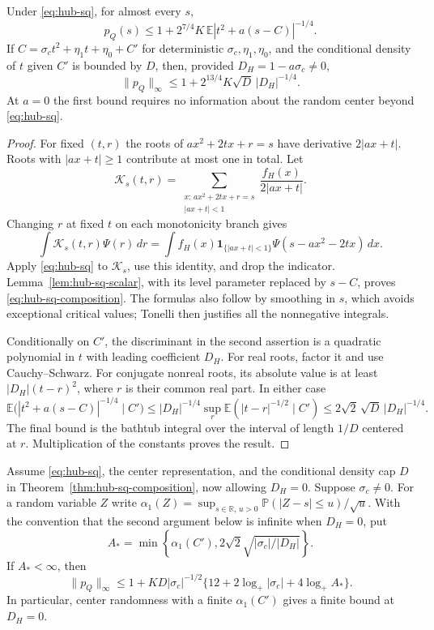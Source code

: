 \begin{theorem}
\label{thm:hub-sq-composition}
Under \eqref{eq:hub-sq}, for almost every $s$,
\begin{equation}\label{eq:hub-sq-composition}
 p_Q(s)\le1+2^{7/4}K\,
                    \mathbb E|t^2+a(s-C)|^{-1/4}.
\end{equation}
If $C=\sigma_c t^2+\eta_1t+\eta_0+C'$ for deterministic
$\sigma_c,\eta_1,\eta_0$, and the conditional density of $t$
given $C'$ is bounded by $D$, then, provided
$D_H=1-a\sigma_c\ne0$,
\[
 \|p_Q\|_\infty
 \le1+2^{13/4}K\sqrt D\,|D_H|^{-1/4}.
\]
At $a=0$ the first bound requires no information about the
random center beyond \eqref{eq:hub-sq}.
\end{theorem}

\begin{proof}
For fixed $(t,r)$ the roots of $ax^2+2tx+r=s$ have derivative
$2|ax+t|$.  Roots with $|ax+t|\ge1$ contribute at most one
in total.  Let
\[
 \mathcal K_s(t,r)=
 \sum_{\substack{x:\,ax^2+2tx+r=s\\|ax+t|<1}}
                         \frac{f_H(x)}{2|ax+t|}.
\]
Changing $r$ at fixed $t$ on each monotonicity branch gives
\[
 \int \mathcal K_s(t,r)\Psi(r)\,dr
 =\int f_H(x)\mathbf1_{\{|ax+t|<1\}}
                    \Psi(s-ax^2-2tx)\,dx.
\]
Apply \eqref{eq:hub-sq} to $\mathcal K_s$, use this identity,
and drop the indicator.  Lemma~\ref{lem:hub-sq-scalar},
with its level parameter replaced by $s-C$, proves
\eqref{eq:hub-sq-composition}.
The formulas also follow by smoothing in $s$, which avoids
exceptional critical values; Tonelli then justifies all the
nonnegative integrals.

Conditionally on $C'$, the discriminant in the second assertion
is a quadratic polynomial in $t$ with leading coefficient $D_H$.
For real roots, factor it and use Cauchy--Schwarz.
For conjugate nonreal roots, its absolute value is at least
$|D_H|(t-r)^2$, where $r$ is their common real part.
In either case
\[
 \mathbb E\bigl(|t^2+a(s-C)|^{-1/4}\mid C'\bigr)
 \le |D_H|^{-1/4}
             \sup_r\mathbb E(|t-r|^{-1/2}\mid C')
 \le2\sqrt2\,\sqrt D\,|D_H|^{-1/4}.
\]
The final bound is the bathtub integral over the interval of
length $1/D$ centered at $r$.  Multiplication of the constants
proves the result.
\end{proof}

\begin{proposition}
\label{prop:hub-sq-log}
Assume \eqref{eq:hub-sq}, the center representation, and the
conditional density cap $D$ in
Theorem~\ref{thm:hub-sq-composition}, now allowing $D_H=0$.
Suppose $\sigma_c\ne0$.
For a random variable $Z$ write
$\alpha_1(Z)=\sup_{s\in\mathbb R,\,u>0}\mathbb P(|Z-s|\le u)/\sqrt u$.
With the convention that the second argument below is infinite
when $D_H=0$, put
\[
 A_*=\min\left\{\alpha_1(C'),
                    2\sqrt2\sqrt{|\sigma_c|/|D_H|}\right\}.
\]
If $A_*<\infty$, then
\[
 \|p_Q\|_\infty
 \le1+KD|\sigma_c|^{-1/2}
       \{12+2\log_+|\sigma_c|+4\log_+ A_*\}.
\]
In particular, center randomness with a finite
$\alpha_1(C')$ gives a finite bound at $D_H=0$.
\end{proposition}

